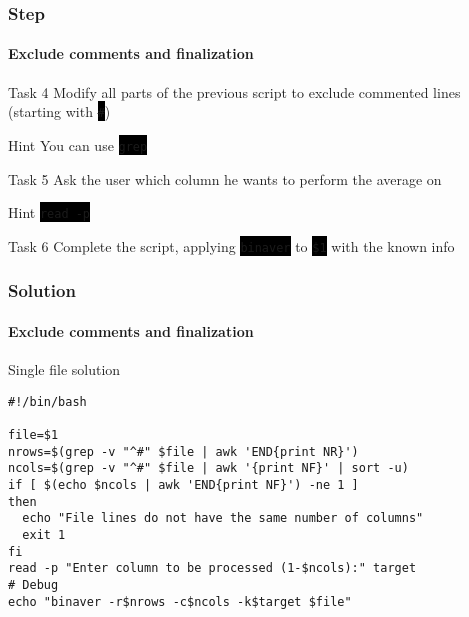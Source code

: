 \documentclass[unknownkeysallowed, 10pt, a4 paper, handout]{beamer}
\newcommand{\code}[1]{\colorbox{black}{\color{green}\texttt{#1}}}
\begin{document}
\begin{frame}
  \frametitle{Step}
  \framesubtitle{Exclude comments and finalization}

  \begin{exampleblock}{Task 4}
    Modify all parts of the previous script to exclude commented lines
   (starting with \code{\#})
  \end{exampleblock}

  \begin{alertblock}{Hint}
    You can use \code{grep}
  \end{alertblock}

  \begin{exampleblock}{Task 5}
    Ask the user which column he wants to perform the average on
  \end{exampleblock}

  \begin{alertblock}{Hint}
    \code{read -p}
  \end{alertblock}

  \begin{exampleblock}{Task 6}
    Complete the script, applying \code{binaver} to \code{\$1} with the
    known info
  \end{exampleblock}
\end{frame}


\begin{frame}[fragile=singleslide]
  \frametitle{Solution}
  \framesubtitle{Exclude comments and finalization}

  \begin{exampleblock}{Single file solution}
    \begin{verbatim}
#!/bin/bash

file=$1
nrows=$(grep -v "^#" $file | awk 'END{print NR}')
ncols=$(grep -v "^#" $file | awk '{print NF}' | sort -u)
if [ $(echo $ncols | awk 'END{print NF}') -ne 1 ]
then
  echo "File lines do not have the same number of columns"
  exit 1
fi
read -p "Enter column to be processed (1-$ncols):" target
# Debug
echo "binaver -r$nrows -c$ncols -k$target $file"
    \end{verbatim}
  \end{exampleblock}
\end{frame}
\end{document}
